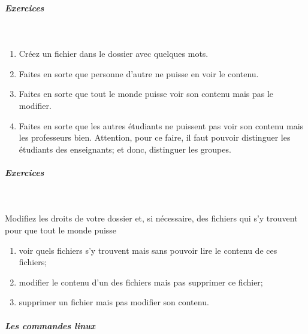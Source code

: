 \documentclass[11pt,a4paper]{article}
\begin{document}
			
		\subparagraph{Exercices} 
		
					\textcolor{white}{.} \par
				
            \par
        
					\begin{enumerate}
				
			\item Cr\'eez un fichier \verb@brol@ dans le dossier \verb@tdLinux@ avec quelques mots.
			\item Faites en sorte que personne d'autre ne puisse en voir le contenu.
			\item Faites en sorte que tout le monde puisse voir son contenu mais pas le modifier. 
			\item 
					  Faites en sorte que les autres \'etudiants ne puissent pas voir son contenu mais les professeurs bien. 
					  Attention, pour ce faire, il faut pouvoir distinguer les \'etudiants des enseignants; et donc, distinguer les groupes.
					
					\end{enumerate}
				
			
		\subparagraph{Exercices} 
		
					\textcolor{white}{.} \par
				
            \par
          
					Modifiez les droits de votre dossier \verb@tdLinux@ et, si n\'ecessaire, 
					des fichiers qui s'y trouvent pour que tout le monde puisse  
				
            \par
        
					\begin{enumerate}
				
			\item voir quels fichiers s'y trouvent mais sans pouvoir lire le contenu de ces fichiers;
			\item modifier le contenu d'un des fichiers mais pas supprimer ce fichier;
			\item supprimer un fichier mais pas modifier son contenu.
					\end{enumerate}
				
			
		\subparagraph{Les commandes linux} 
		
\end{document}
